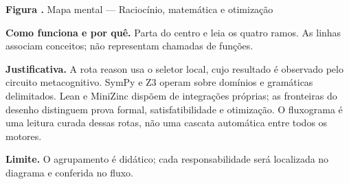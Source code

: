 {\small\textbf{Figura \thefigure.} Mapa mental --- Raciocínio, matemática e otimização}\par\smallskip
\noindent\textbf{Como funciona e por quê.} Parta do centro e leia os quatro ramos. As linhas associam conceitos; não representam chamadas de funções.\par
\noindent\textbf{Justificativa.} A rota reason usa o seletor local, cujo resultado é observado pelo circuito metacognitivo. SymPy e Z3 operam sobre domínios e gramáticas delimitados. Lean e MiniZinc dispõem de integrações próprias; as fronteiras do desenho distinguem prova formal, satisfatibilidade e otimização. O fluxograma é uma leitura curada dessas rotas, não uma cascata automática entre todos os motores.\par
\noindent\textbf{Limite.} O agrupamento é didático; cada responsabilidade será localizada no diagrama e conferida no fluxo.\par\smallskip
{}
